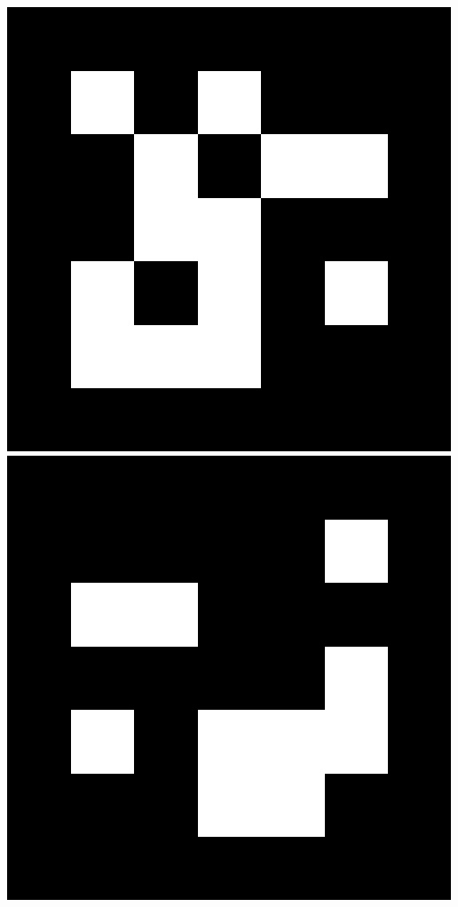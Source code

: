 \documentclass[main.tex]{subfiles}
\begin{document}
\includegraphics[scale=.2]{images/aruco1.jpg}
\includegraphics[scale=.2]{images/aruco2.jpg}
\end{document}
